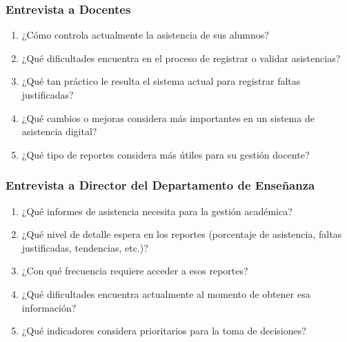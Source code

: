 \documentclass[12pt, a4paper]{article}
\begin{document}
                                                                \subsubsection*{Entrevista a Docentes}
                                                                \begin{enumerate}
                                                                \item ¿Cómo controla actualmente la asistencia de sus alumnos?
                                                                \item ¿Qué dificultades encuentra en el proceso de registrar o validar asistencias?
                                                                \item ¿Qué tan práctico le resulta el sistema actual para registrar faltas justificadas?
                                                                \item ¿Qué cambios o mejoras considera más importantes en un sistema de asistencia digital?
                                                                \item ¿Qué tipo de reportes considera más útiles para su gestión docente?
                                                                \end{enumerate}

                                                                \subsubsection*{Entrevista a Director del Departamento de Enseñanza}
                                                                \begin{enumerate}
                                                                \item ¿Qué informes de asistencia necesita para la gestión académica?
                                                                \item ¿Qué nivel de detalle espera en los reportes (porcentaje de asistencia, faltas justificadas, tendencias, etc.)?
                                                                \item ¿Con qué frecuencia requiere acceder a esos reportes?
                                                                \item ¿Qué dificultades encuentra actualmente al momento de obtener esa información?
                                                                \item ¿Qué indicadores considera prioritarios para la toma de decisiones?
                                                                \end{enumerate}
\end{document}
